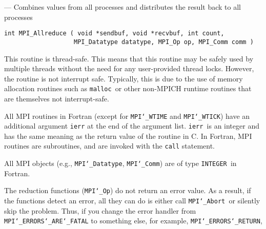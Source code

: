 \startmanpage
{}
--- Combines values from all processes and distributes the result back to all processes 
\startvb\begin{verbatim}
int MPI_Allreduce ( void *sendbuf, void *recvbuf, int count, 
                   MPI_Datatype datatype, MPI_Op op, MPI_Comm comm )

\end{verbatim}
\endvb

\par
{}
\par
{}
\par
This routine is thread-safe.  This means that this routine may be
safely used by multiple threads without the need for any user-provided
thread locks.  However, the routine is not interrupt safe.  Typically,
this is due to the use of memory allocation routines such as {\tt malloc
}or other non-MPICH runtime routines that are themselves not interrupt-safe.
\par
{}
All MPI routines in Fortran (except for {\tt MPI{\tt \char`\_}WTIME} and {\tt MPI{\tt \char`\_}WTICK}) have
an additional argument {\tt ierr} at the end of the argument list.  {\tt ierr
}is an integer and has the same meaning as the return value of the routine
in C.  In Fortran, MPI routines are subroutines, and are invoked with the
{\tt call} statement.
\par
All MPI objects (e.g., {\tt MPI{\tt \char`\_}Datatype}, {\tt MPI{\tt \char`\_}Comm}) are of type {\tt INTEGER
}in Fortran.
\par
{}
\par
The reduction functions ({\tt MPI{\tt \char`\_}Op}) do not return an error value.  As a result,
if the functions detect an error, all they can do is either call {\tt MPI{\tt \char`\_}Abort
}or silently skip the problem.  Thus, if you change the error handler from
{\tt MPI{\tt \char`\_}ERRORS{\tt \char`\_}ARE{\tt \char`\_}FATAL} to something else, for example, {\tt MPI{\tt \char`\_}ERRORS{\tt \char`\_}RETURN},
